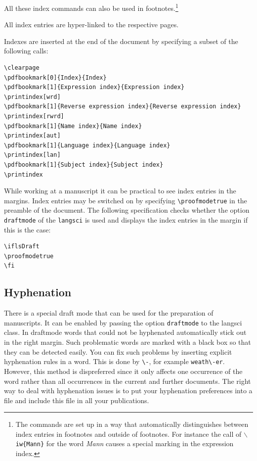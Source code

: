 All these index commands can also be used in footnotes.\footnote{
  The commands are set up in a way that automatically distinguishes between index entries in
  footnotes and outside of footnotes. For instance the call of \texttt{$\backslash$iw\{Mann\}} for the word
  \emph{Mann} causes a special marking in the expression index.
}

All index entries are hyper-linked to the respective pages.

Indexes are inserted at the end of the document by specifying a subset of the following calls:
\begin{verbatim}
\clearpage
\pdfbookmark[0]{Index}{Index}
\pdfbookmark[1]{Expression index}{Expression index}
\printindex[wrd]
\pdfbookmark[1]{Reverse expression index}{Reverse expression index}
\printindex[rwrd]
\pdfbookmark[1]{Name index}{Name index}
\printindex[aut]
\pdfbookmark[1]{Language index}{Language index}
\printindex[lan]
\pdfbookmark[1]{Subject index}{Subject index}
\printindex
\end{verbatim}

While working at a manuscript it can be practical to see index entries in the margins. Index entries may be
switched on by specifying \verb+\proofmodetrue+ in the preamble of the
document. The following specification checks whether the option
\texttt{draftmode} of the \texttt{langsci} is used and displays the index entries in the margin if
this is the case:
\begin{verbatim}
\iflsDraft
\proofmodetrue
\fi
\end{verbatim}



\subsection{Hyphenation}

There is a special draft mode that can be used for the preparation of manuscripts. It can be enabled
by passing the option \texttt{draftmode} to the langsci class. In draftmode words that could not be
hyphenated automatically stick out in the right margin. Such problematic words are marked with a
black box so that they can be detected easily. You can fix such problems by inserting explicit
hyphenation rules in a word. This is done by \verb+\-+, for example \verb+weath\-er+. However, this
method is dispreferred since it only affects one occurrence of the word rather than all occurrences in
the current and further documents. The right way to deal with hyphenation issues is to put your
hyphenation preferences into a file and include this file in all your publications. 

